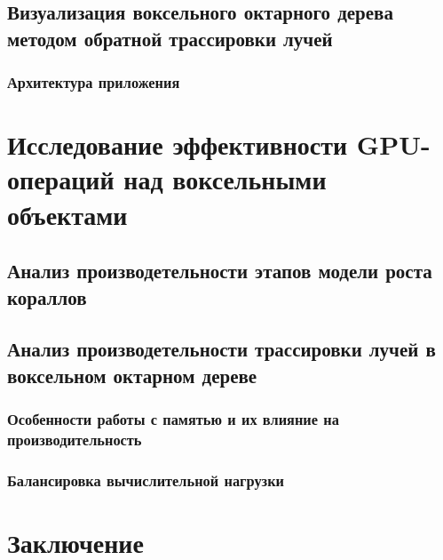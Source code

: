 \documentclass[a4paper,14pt]{extreport}
\begin{document}
\section{Визуализация воксельного октарного дерева методом обратной трассировки лучей}
\subsection{Архитектура приложения}

\chapter{Исследование эффективности GPU-операций над воксельными объектами}
\section{Анализ производетельности этапов модели роста кораллов}
\section{Анализ производетельности трассировки лучей в воксельном октарном дереве}
\subsection{Особенности работы с памятью и их влияние на производительность}
\subsection{Балансировка вычислительной нагрузки}

\chapter*{Заключение}

\begin{thebibliography}{99}

\end{thebibliography}



%

%
%
%
%




\end{document}
